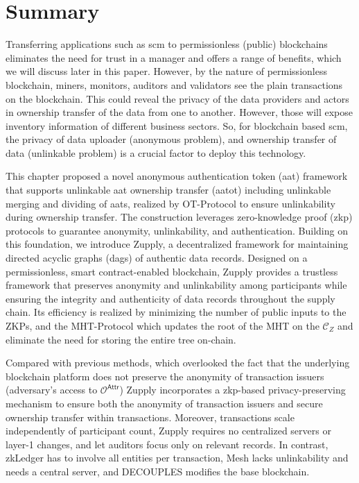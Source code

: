 \section{Summary}
\label{app:zupply-summary}


Transferring applications such as \gls{scm}  to permissionless (public) blockchains eliminates the need for trust in a manager and offers a range of benefits, which we will discuss later in this paper. However, by the nature of permissionless blockchain, miners, monitors, auditors and validators see the plain transactions on the blockchain.  This could reveal the privacy of the data providers  and actors in  ownership transfer  of the data from one to another.  However, those will expose inventory information of different business sectors.  So, for blockchain based \gls{scm}, the privacy of data uploader (anonymous problem), and ownership transfer of data (unlinkable problem) is a crucial factor to deploy this technology. 

This chapter proposed a novel anonymous authentication token (\gls{aat}) framework that supports unlinkable \gls{aat} ownership transfer (\gls{aatot}) including unlinkable merging and dividing of \gls{aat}s, realized by \textsf{OT-Protocol} to ensure unlinkability during ownership transfer. The construction leverages zero-knowledge proof (\gls{zkp}) protocols to guarantee anonymity, unlinkability, and authentication. Building on this foundation, we introduce Zupply, a decentralized framework for maintaining directed acyclic graphs (\gls{dag}s) of authentic data records. Designed on a permissionless, smart contract-enabled blockchain, Zupply provides a trustless framework that preserves anonymity and unlinkability among participants while ensuring the integrity and authenticity of data records throughout the supply chain. Its efficiency is realized by minimizing the number of public inputs to the ZKPs, and the \textsf{MHT-Protocol} which updates the root of the MHT on the $\mathcal{C}_Z$  and eliminate the need for storing the entire tree on-chain. 




Compared with previous methods,  which overlooked the fact that the underlying blockchain platform does not preserve the anonymity of transaction issuers (adversary's access to $\mathcal{O}^\mathsf{Attr}$)  Zupply incorporates a \gls{zkp}-based privacy-preserving mechanism to ensure both the anonymity of transaction issuers and secure ownership transfer within transactions.
Moreover, transactions scale independently of participant count, Zupply requires no centralized servers or layer-1 changes, and let auditors focus only on relevant records. In contrast, zkLedger \cite{zkLedger2018} has to involve all entities per transaction, Mesh \cite{altawy2019mesh} lacks unlinkability and needs a central server, and DECOUPLES \cite{Maouchi2019DECOUPLES} modifies the base blockchain. 